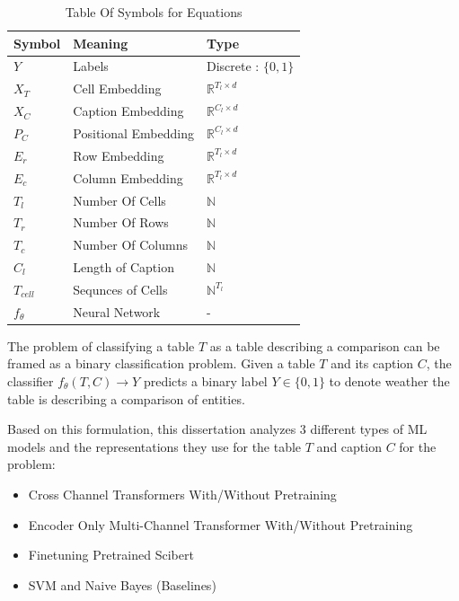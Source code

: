 \begin{table}
    \label{table\arabic{tablecounter}}
    \centering
    \begin{tabular}{|l|l|l|}
        \hline
        Symbol & Meaning & Type \\ \hline
        $Y$ & Labels & Discrete : $\{0,1\}$ \\ \hline
        $X_T$ & Cell Embedding & $\mathbb{R}^{T_l \times d}$\\ \hline
        $X_C$ & Caption Embedding & $\mathbb{R}^{C_l \times d}$ \\ \hline
        $P_C$ & Positional Embedding & $\mathbb{R}^{C_l \times d}$ \\ \hline
        $E_r$ & Row Embedding & $\mathbb{R}^{T_l \times d}$ \\ \hline
        $E_c$ & Column Embedding & $\mathbb{R}^{T_l \times d}$ \\ \hline
        $T_l$ & Number Of Cells & $\mathbb{N}$ \\ \hline
        $T_r$ & Number Of Rows & $\mathbb{N}$ \\ \hline
        $T_c$ & Number Of Columns & $\mathbb{N}$ \\ \hline
        $C_l$ & Length of Caption & $\mathbb{N}$ \\ \hline
        $T_{cell}$ & Sequnces of Cells & $\mathbb{N}^{T_l}$ \\ \hline
        $f_\theta$ & Neural Network & - \\ \hline
    \end{tabular}
    \caption{\label{tablecounter} Table Of Symbols for Equations}
\end{table}
The problem of classifying a table $T$ as a table describing a comparison can be framed as a binary classification problem. Given a table $T$ and its caption $C$, the classifier $f_\theta(T,C) \rightarrow Y$ predicts a binary label $Y \in \{0,1\}$ to denote weather the table is describing a comparison of entities. 

Based on this formulation, this dissertation analyzes 3 different types of ML models and the representations they use for the table $T$ and caption $C$ for the problem:
\begin{itemize}
    \item Cross Channel Transformers With/Without Pretraining
    \item Encoder Only Multi-Channel Transformer With/Without Pretraining
    \item Finetuning Pretrained Scibert
    \item SVM and Naive Bayes (Baselines)
\end{itemize}

